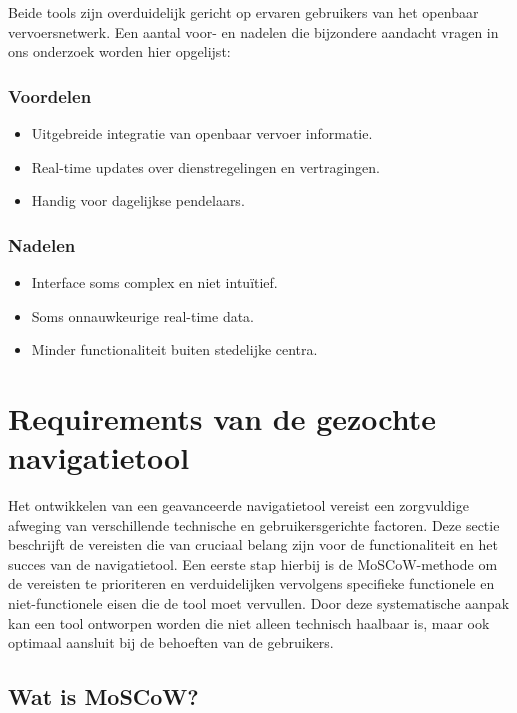 Beide tools zijn overduidelijk gericht op ervaren gebruikers van het openbaar vervoersnetwerk. Een aantal voor- en nadelen die bijzondere aandacht vragen in ons onderzoek worden hier opgelijst:

\subsubsection*{Voordelen}
\begin{itemize}
    \item Uitgebreide integratie van openbaar vervoer informatie.
    \item Real-time updates over dienstregelingen en vertragingen.
    \item Handig voor dagelijkse pendelaars.
\end{itemize}
\subsubsection*{Nadelen}
\begin{itemize}
    \item Interface soms complex en niet intuïtief.
    \item Soms onnauwkeurige real-time data.
    \item Minder functionaliteit buiten stedelijke centra.
\end{itemize}

\section{Requirements van de gezochte navigatietool}
\label{sec:requirements-van-de-gezochte-navigatietool}

Het ontwikkelen van een geavanceerde navigatietool vereist een zorgvuldige afweging van verschillende technische en gebruikersgerichte factoren. Deze sectie beschrijft de vereisten die van cruciaal belang zijn voor de functionaliteit en het succes van de navigatietool. Een eerste stap hierbij is de MoSCoW-methode om de vereisten te prioriteren en verduidelijken vervolgens specifieke functionele en niet-functionele eisen die de tool moet vervullen. Door deze systematische aanpak kan een tool ontworpen worden die niet alleen technisch haalbaar is, maar ook optimaal aansluit bij de behoeften van de gebruikers.

\subsection{Wat is MoSCoW?}

